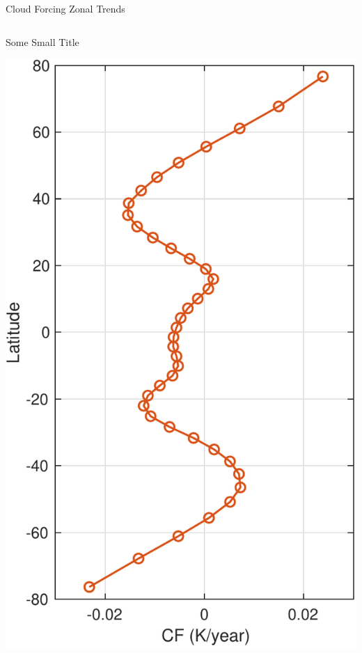 \documentclass[10pt,t]{beamer}
\begin{document}
\begin{frame}[label={sec:org9a39960}]{Cloud Forcing Zonal Trends}
\vspace{-0.3in}

\begin{columns}
\begin{column}{0.33\columnwidth}
\begin{block}{\footnotesize Some Small Title}
\vspace{0.0in}
\begin{center}
\includegraphics[width=\linewidth]{./Figs/Pdf/new_trend_rand_stats_1231_and_2161_era_clr_minus_obs_smoothed.pdf}
\end{center}
\end{block}
\end{column}


\end{columns}
\end{frame}
\end{document}
